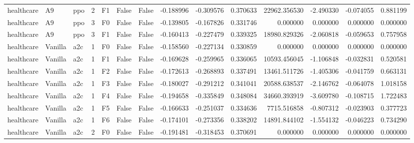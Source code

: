 \begin{tabular}{lllrlllrrrrrrr}
healthcare &      A9 &       ppo &     2 &  F1 &           False &            False & -0.188996 & -0.309576 & 0.370633 &     22962.356530 &          -2.490330 &       -0.074055 &            0.881199 \\
healthcare &      A9 &       ppo &     3 &  F0 &           False &            False & -0.139805 & -0.167826 & 0.331746 &         0.000000 &           0.000000 &        0.000000 &            0.000000 \\
healthcare &      A9 &       ppo &     3 &  F1 &           False &            False & -0.160413 & -0.227479 & 0.339325 &     18980.829326 &          -2.060818 &       -0.059653 &            0.757958 \\
healthcare & Vanilla &       a2c &     1 &  F0 &           False &            False & -0.158560 & -0.227134 & 0.330859 &         0.000000 &           0.000000 &        0.000000 &            0.000000 \\
healthcare & Vanilla &       a2c &     1 &  F1 &           False &            False & -0.169628 & -0.259965 & 0.336065 &     10593.456045 &          -1.106848 &       -0.032831 &            0.520581 \\
healthcare & Vanilla &       a2c &     1 &  F2 &           False &            False & -0.172613 & -0.268893 & 0.337491 &     13461.511726 &          -1.405306 &       -0.041759 &            0.663131 \\
healthcare & Vanilla &       a2c &     1 &  F3 &           False &            False & -0.180027 & -0.291212 & 0.341041 &     20588.638537 &          -2.146762 &       -0.064078 &            1.018158 \\
healthcare & Vanilla &       a2c &     1 &  F4 &           False &            False & -0.194658 & -0.335849 & 0.348084 &     34660.393919 &          -3.609780 &       -0.108715 &            1.722483 \\
healthcare & Vanilla &       a2c &     1 &  F5 &           False &            False & -0.166633 & -0.251037 & 0.334636 &      7715.516858 &          -0.807312 &       -0.023903 &            0.377723 \\
healthcare & Vanilla &       a2c &     1 &  F6 &           False &            False & -0.174101 & -0.273356 & 0.338202 &     14891.844102 &          -1.554132 &       -0.046223 &            0.734290 \\
healthcare & Vanilla &       a2c &     2 &  F0 &           False &            False & -0.191481 & -0.318453 & 0.370691 &         0.000000 &           0.000000 &        0.000000 &            0.000000 \\

\end{tabular}
